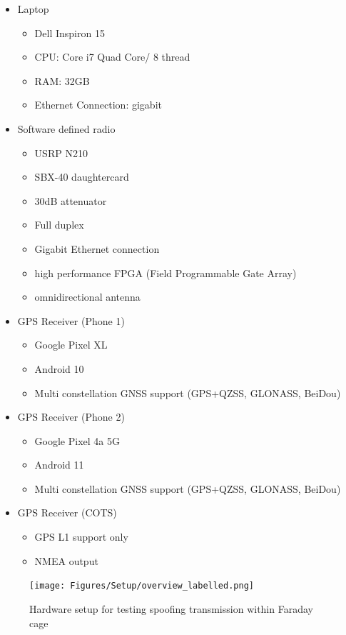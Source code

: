 \begin{itemize}
    \item Laptop
    \begin{itemize}
        \item Dell Inspiron 15
        \item CPU: Core i7 Quad Core/ 8 thread
        \item RAM: 32GB
        \item Ethernet Connection: gigabit
    \end{itemize}
    \item Software defined radio
    \begin{itemize}
        \item USRP N210
        \item SBX-40 daughtercard
        \item 30dB attenuator
        \item Full duplex
        \item Gigabit Ethernet connection
        \item high performance FPGA (Field Programmable Gate Array)
        \item omnidirectional antenna
    \end{itemize}
    \item GPS Receiver (Phone 1)
    \begin{itemize}
        \item Google Pixel XL
        \item Android 10
        \item Multi constellation GNSS support (GPS+QZSS, GLONASS, BeiDou)
    \end{itemize}
    \item GPS Receiver (Phone 2)
    \begin{itemize}
        \item Google Pixel 4a 5G
        \item Android 11
        \item Multi constellation GNSS support (GPS+QZSS, GLONASS, BeiDou)
    \end{itemize}
    \item GPS Receiver (COTS)
    \begin{itemize}
        \item GPS L1 support only
        \item NMEA output
    \end{itemize}
\end{itemize}

\begin{figure}[!h]
    \begin{centering}
        \texttt{[image: Figures/Setup/overview\_labelled.png]}
        \caption{Hardware setup for testing spoofing transmission within Faraday cage}
    \label{fig:HardwareSetup}
    \end{centering}
\end{figure}

